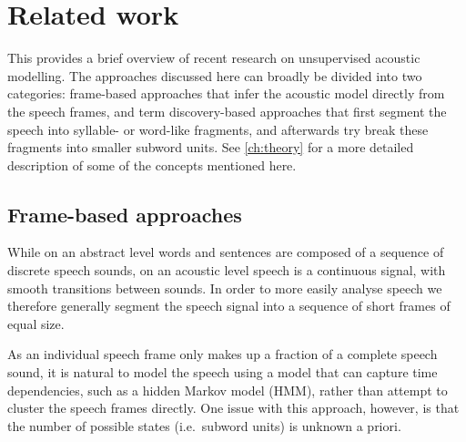 %
%
%

\section{Related work}
\label{ch:related-work}

This  provides a brief overview of recent research on unsupervised acoustic modelling.
The approaches discussed here can broadly be divided into two categories: frame-based approaches that infer the acoustic model directly from the speech frames, and term discovery-based approaches that first segment the speech into syllable- or word-like fragments, and afterwards try break these fragments into smaller subword units.
See \cref{ch:theory} for a more detailed description of some of the concepts mentioned here.

\subsection{Frame-based approaches}

While on an abstract level words and sentences are composed of a sequence of discrete speech sounds, on an acoustic level speech is a continuous signal, with smooth transitions between sounds.
In order to more easily analyse speech we therefore generally segment the speech signal into a sequence of short frames of equal size.

As an individual speech frame only makes up a fraction of a complete speech sound, it is natural to model the speech using a model that can capture time dependencies, such as a hidden Markov model (HMM), rather than attempt to cluster the speech frames directly.
One issue with this approach, however, is that the number of possible states (i.e.\ subword units) is unknown a priori.

